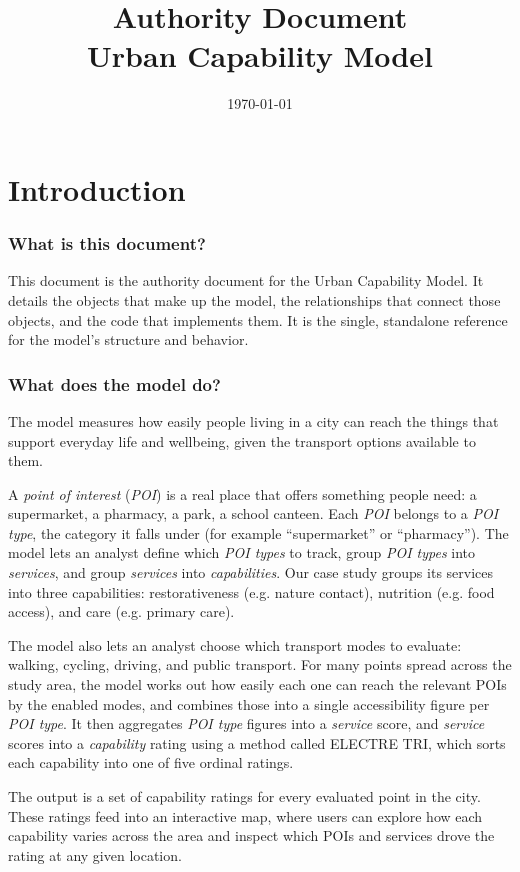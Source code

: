 \documentclass{article}
\title{Authority Document \\Urban Capability Model}
\date{\today}
\begin{document}
\maketitle

\section{Introduction}

\subsubsection*{What is this document?}
This document is the authority document for the Urban Capability Model. It details the objects that make up the model, the relationships that connect those objects, and the code that implements them. It is the single, standalone reference for the model's structure and behavior.

\subsubsection*{What does the model do?}
The model measures how easily people living in a city can reach the things that support everyday life and wellbeing, given the transport options available to them.

A \emph{point of interest} (\emph{POI}) is a real place that offers something people need: a supermarket, a pharmacy, a park, a school canteen. Each \emph{POI} belongs to a \emph{POI type}, the category it falls under (for example ``supermarket'' or ``pharmacy''). The model lets an analyst define which \emph{POI types} to track, group \emph{POI types} into \emph{services}, and group \emph{services} into \emph{capabilities}. Our case study groups its services into three capabilities: restorativeness (e.g. nature contact), nutrition (e.g. food access), and care (e.g. primary care).

The model also lets an analyst choose which transport modes to evaluate: walking, cycling, driving, and public transport. For many points spread across the study area, the model works out how easily each one can reach the relevant POIs by the enabled modes, and combines those into a single accessibility figure per \emph{POI type}. It then aggregates \emph{POI type} figures into a \emph{service} score, and \emph{service} scores into a \emph{capability} rating using a method called ELECTRE TRI, which sorts each capability into one of five ordinal ratings.

The output is a set of capability ratings for every evaluated point in the city. These ratings feed into an interactive map, where users can explore how each capability varies across the area and inspect which POIs and services drove the rating at any given location.
\end{document}
